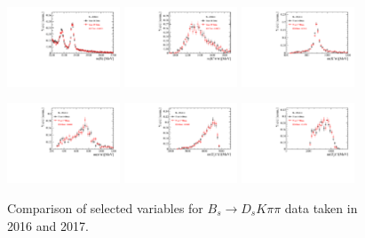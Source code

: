 \begin{figure}[h]
\centering
\includegraphics[height=!,width=0.3\textwidth]{figs/dataVsMC/year16vs17_signal/Ds2all_Bs_DTF_MM.pdf}
\includegraphics[height=!,width=0.3\textwidth]{figs/dataVsMC/year16vs17_signal/Ds2all_m_Kpipi.pdf}
\includegraphics[height=!,width=0.3\textwidth]{figs/dataVsMC/year16vs17_signal/Ds2all_m_Kpi.pdf}

\includegraphics[height=!,width=0.3\textwidth]{figs/dataVsMC/year16vs17_signal/Ds2all_m_pipi.pdf}
\includegraphics[height=!,width=0.3\textwidth]{figs/dataVsMC/year16vs17_signal/Ds2all_m_Dspipi.pdf}
\includegraphics[height=!,width=0.3\textwidth]{figs/dataVsMC/year16vs17_signal/Ds2all_m_Dspi.pdf}

\caption{Comparison of selected variables for $B_s \to D_s K \pi \pi$ data taken in 2016 and 2017.}
\label{fig:}
\end{figure}

